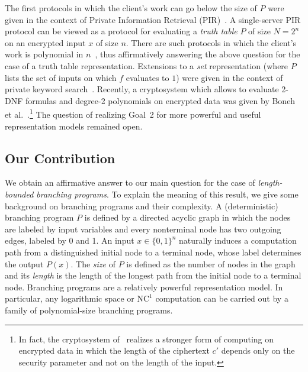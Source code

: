 \documentclass[11pt]{article}
\newcommand{\NCone}{{\mathrm{NC}}^1}
\begin{document}
The first protocols in which the client's work can go below the
size of $P$ were given in the context of Private Information
Retrieval (PIR)~\cite{CGKS95,KO97}. A single-server PIR
protocol can be viewed as a protocol for evaluating a {\em
truth table} $P$ of size $N=2^n$ on an encrypted input $x$ of
size $n$. There are such protocols in which the client's work
is polynomial in $n$~\cite{CMS99,L04}, thus affirmatively
answering the above question for the case of a truth table
representation.
Extensions to a {\em set} representation (where $P$ lists the set
of inputs on which $f$ evaluates to $1$) were given in the context
of private keyword search~\cite{KO97,CGN,FIPR05,OS}. Recently, a cryptosystem which allows to evaluate 2-DNF formulas and degree-2
polynomials on encrypted data was given by Boneh et
al.~\cite{BGN}.\footnote{In fact, the cryptosystem of~\cite{BGN} realizes a stronger form of computing on encrypted data in which the length
of the ciphertext $c'$ depends only on the security parameter and
not on the length of the input. } The question of realizing Goal~2
for more powerful and useful representation models remained open.

\subsection{Our Contribution}

We obtain an affirmative answer to our main question for the case of
{\em length-bounded branching programs}. To explain the meaning of
this result, we give some background on branching programs and their
complexity. A (deterministic) branching program $P$ is defined by a
directed acyclic graph in which the nodes are labeled by input
variables and every nonterminal node has two outgoing edges, labeled
by 0 and 1. An input $x\in\{0,1\}^n$ naturally induces a computation
path from a distinguished initial node to a terminal node, whose
label determines the output $P(x)$. The {\em size} of $P$ is defined
as the number of nodes in the graph and its {\em length} is the
length of the longest path from the initial node to a terminal node.
Branching programs are a relatively powerful representation model.
In particular, any logarithmic space or $\NCone$ computation can be
carried out by a family of polynomial-size branching programs.
\end{document}
